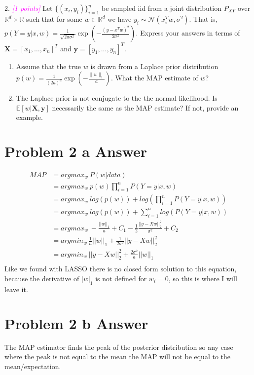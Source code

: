 \documentclass{article}
\newcommand{\field}[1]{\mathbb{#1}}
\newcommand{\mb}[1]{\mathbf{#1}}
\newcommand{\1}{\mathbf{1}}
\newcommand{\E}{\mathbb{E}} %
\newcommand{\R}{\field{R}} %
\newcommand{\grade}[1]{\small\textcolor{magenta}{\emph{[#1 points]}} \normalsize}
\begin{document}
2. \grade{1} Let $\{(x_i,y_i)\}_{i=1}^n$ be sampled iid from a joint distribution $P_{XY}$ over $\R^d \times \R$ such that for some $w \in \R^d$ we have $y_i \sim \mathcal{N}(x_i^T w,\sigma^2)$. That is, $p(Y =y | x, w) = \frac{1}{\sqrt{2\pi\sigma^2}} \exp(-\frac{(y-x^T w)^2}{2\sigma^2})$. Express your answers in terms of $\mb{X} = [x_1,\dots,x_n]^T$ and $\mb{y} = [y_1,\dots,y_n]^T$.
\begin{enumerate}
  \item Assume that the true $w$ is drawn from a Laplace prior distribution $p(w) = \frac{1}{(2a)^d} \exp(-\frac{\|w\|_1}{a})$. What the MAP estimate of $w$?
  \item The Laplace prior is not conjugate to the the normal likelihood. Is $\E[w | \mb{X}, \mb{y} ]$ necessarily the same as the MAP estimate? If not, provide an example.  
\end{enumerate}



\section*{Problem 2 a Answer}

\begin{align}
    MAP & = argmax_w \  P(w | data ) \\
    & = argmax_w \   p(w)  \prod_{i=1}^{n} P(Y=y | x, w)  \\ 
    & = argmax_w \  log( p(w) ) + log(   \prod_{i=1}^{n} P(Y=y | x, w)  )  \\
    & = argmax_w \  log( p(w) ) +   \sum_{i=1}^{n} log( P(Y=y | x, w)  )  \\ 
    & = argmax_w \  - \frac{||w||_1}{ a } + C_1 - \frac{1}{2} \frac{|| y - Xw ||^2_2}{\sigma^2} + C_2    \\ 
    & = argmin_w \    \frac{1}{a} ||w||_1  +  \frac{1}{2\sigma^2} || y - Xw ||^2_2    \\ 
    & = argmin_w \    || y - Xw ||^2_2 + \frac{2\sigma^2}{a} ||w||_1   \\ 
\end{align}
Like we found with LASSO there is no closed form solution to this equation, because the derivative of $|w|_1$ is not defined for $w_i=0$, so this is where I will leave it. 


\section*{Problem 2 b Answer}

The MAP estimator finds the peak of the posterior distribution so any case where the peak is not equal to the mean the MAP will not be equal to the mean/expectation.
\end{document}
